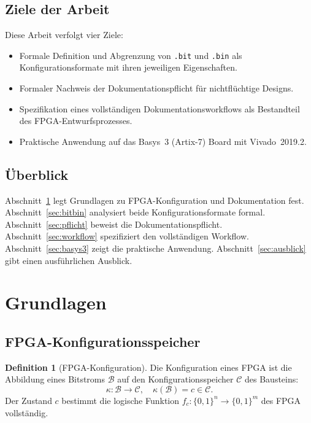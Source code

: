 ﻿\documentclass[a4paper,12pt]{article}
\theoremstyle{definition}
\newtheorem{definition}{Definition}
\begin{document}
\subsection{Ziele der Arbeit}

Diese Arbeit verfolgt vier Ziele:
\begin{itemize}
    \item Formale Definition und Abgrenzung von \texttt{.bit} und \texttt{.bin}
          als Konfigurationsformate mit ihren jeweiligen Eigenschaften.
    \item Formaler Nachweis der Dokumentationspflicht für nichtflüchtige Designs.
    \item Spezifikation eines vollständigen Dokumentationsworkflows als
          Bestandteil des FPGA-Entwurfsprozesses.
    \item Praktische Anwendung auf das Basys~3 (Artix-7) Board mit Vivado~2019.2.
\end{itemize}

\subsection{Überblick}

Abschnitt~\ref{sec:grundlagen} legt Grundlagen zu FPGA-Konfiguration und
Dokumentation fest. Abschnitt~\ref{sec:bitbin} analysiert beide
Konfigurationsformate formal. Abschnitt~\ref{sec:pflicht} beweist die
Dokumentationspflicht. Abschnitt~\ref{sec:workflow} spezifiziert den
vollständigen Workflow. Abschnitt~\ref{sec:basys3} zeigt die praktische
Anwendung. Abschnitt~\ref{sec:ausblick} gibt einen ausführlichen Ausblick.

\section{Grundlagen}
\label{sec:grundlagen}

\subsection{FPGA-Konfigurationsspeicher}

\begin{definition}[FPGA-Konfiguration]
    Die Konfiguration eines FPGA ist die Abbildung eines Bitstroms $\mathcal{B}$
    auf den Konfigurationsspeicher $\mathcal{C}$ des Bausteins:
    \[
    \kappa: \mathcal{B} \to \mathcal{C}, \quad \kappa(\mathcal{B}) = c \in \mathcal{C}.
    \]
    Der Zustand $c$ bestimmt die logische Funktion $f_c: \{0,1\}^n \to \{0,1\}^m$
    des FPGA vollständig.
\end{definition}
\end{document}
